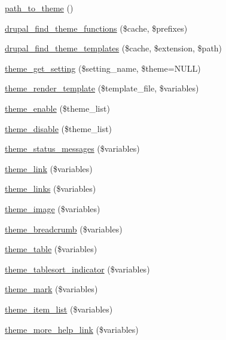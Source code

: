 \begin{DoxyCompactItemize}
\item 
\hyperlink{includes_2theme_8inc_a8fd73902b4d3a2d476e5b1324506b5e1}{path\_\-to\_\-theme} ()
\item 
\hyperlink{includes_2theme_8inc_a38b3ec5ba23e776b29f3f907a75711f1}{drupal\_\-find\_\-theme\_\-functions} (\$cache, \$prefixes)
\item 
\hyperlink{includes_2theme_8inc_aa755f6e8f11a62c9e90a6d7af55145b1}{drupal\_\-find\_\-theme\_\-templates} (\$cache, \$extension, \$path)
\item 
\hyperlink{includes_2theme_8inc_a7cb0fd8d3be02b386d3bd88a3f1dcf1f}{theme\_\-get\_\-setting} (\$setting\_\-name, \$theme=NULL)
\item 
\hyperlink{includes_2theme_8inc_a726ca00e65b455bb895c8abf1dfb1df2}{theme\_\-render\_\-template} (\$template\_\-file, \$variables)
\item 
\hyperlink{includes_2theme_8inc_a145f4abe8c30a0c1bc012ce634448c79}{theme\_\-enable} (\$theme\_\-list)
\item 
\hyperlink{includes_2theme_8inc_a03fbdb816d1b0a97b0e65291831c0cdb}{theme\_\-disable} (\$theme\_\-list)
\item 
\hyperlink{group__themeable_gad29a18ad4d19a5fc0a3c75a8804f0331}{theme\_\-status\_\-messages} (\$variables)
\item 
\hyperlink{group__themeable_ga4ab7d25ecbea3d5367e75c965f7afe55}{theme\_\-link} (\$variables)
\item 
\hyperlink{group__themeable_gab75b290dbc9541e2fb0d9e57cbcdda5c}{theme\_\-links} (\$variables)
\item 
\hyperlink{group__themeable_gae97e7e2541a9eb4e69e72b6945fec32c}{theme\_\-image} (\$variables)
\item 
\hyperlink{group__themeable_gaf05700c211b33b8ae6b258e2946b782c}{theme\_\-breadcrumb} (\$variables)
\item 
\hyperlink{group__themeable_ga9e35aa108c35f87b588197138a51823d}{theme\_\-table} (\$variables)
\item 
\hyperlink{group__themeable_ga06cbe52fad2dac8196f8c89118c3975d}{theme\_\-tablesort\_\-indicator} (\$variables)
\item 
\hyperlink{group__themeable_ga10b9e641d13efcf0ed3e55fd03bc4f54}{theme\_\-mark} (\$variables)
\item 
\hyperlink{group__themeable_ga515afdc4832483a813cd09ba4786fdfe}{theme\_\-item\_\-list} (\$variables)
\item 
\hyperlink{group__themeable_ga59ab4d425ab4c43d94c26538fbe3e9aa}{theme\_\-more\_\-help\_\-link} (\$variables)

\end{DoxyCompactItemize}
